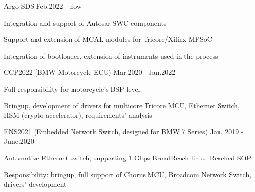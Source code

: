 


\begin{cventries}


\cventry
{} %
{Argo SDS} %
{} %
{Feb.2022 - now} %
{ %
\begin{cvitems}
\item {Integration and support of Autosar SWC components }
\item {Support and extension of MCAL modules for Tricore/Xilinx MPSoC }
\item {Integration of bootloader, extension of instruments used in the process }
\end{cvitems}
}
\newline
\newline


\cventry
{} %
{CCP2022 (BMW Motorcycle ECU)} %
{} %
{Mar.2020 - Jan.2022} %
{ %
\begin{cvitems}
\item {Full responsibility for motorcycle's BSP level.}
\item {Bringup, development of drivers for multicore Tricore MCU, Ethernet Switch, HSM (crypto-accelerator), requirements' analysis}
\end{cvitems}
}
\newline
\newline

\cventry
{} %
{ENS2021 (Embedded Network Switch, designed for BMW 7 Series)} %
{} %
{Jan. 2019 - June.2020} %
{ %
\begin{cvitems}
\item {Automotive Ethernet switch, supporting 1 Gbps BroadReach links. Reached SOP}
\item {Responsibility: bringup, full support of Chorus MCU, Broadcom Network Switch, drivers' development}
\end{cvitems}
}
\newline
\newline


\end{cventries}
